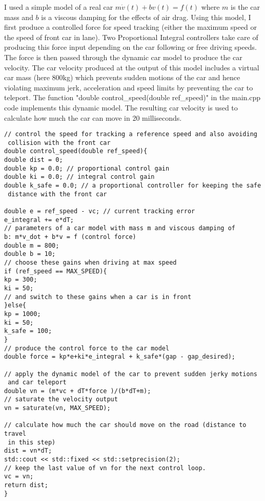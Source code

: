 \documentclass[12pt]{article}
\begin{document}
I used a simple model of a real car $m \dot{v} (t)+ bv(t) = f(t)$ where $m$ is the car mass and $b$ is a viscous damping for the effects of air drag. Using this model, I first produce a controlled force for speed tracking (either the maximum speed or the speed of front car in lane). Two Proportional Integral controllers take care of producing this force input depending on the car following or free driving speeds. The force is then passed through the dynamic car model to produce the car velocity. The car velocity produced at the output of this model includes a virtual car mass (here 800kg) which prevents sudden motions of the car and hence violating maximum jerk, acceleration and speed limits by preventing the car to teleport. The function "double control\_speed(double ref\_speed)" in the main.cpp code implements this dynamic model. The resulting car velocity is used to calculate how much the car can move in 20 milliseconds. 
\begin{verbatim}
// control the speed for tracking a reference speed and also avoiding
 collision with the front car
double control_speed(double ref_speed){
double dist = 0;
double kp = 0.0; // proportional control gain
double ki = 0.0; // integral control gain
double k_safe = 0.0; // a proportional controller for keeping the safe
 distance with the front car

double e = ref_speed - vc; // current tracking error
e_integral += e*dT;
// parameters of a car model with mass m and viscous damping of 
b: m*v_dot + b*v = f (control force)
double m = 800;
double b = 10;
// choose these gains when driving at max speed
if (ref_speed == MAX_SPEED){
kp = 300;
ki = 50;
// and switch to these gains when a car is in front
}else{
kp = 1000;
ki = 50;
k_safe = 100;
}	
// produce the control force to the car model 
double force = kp*e+ki*e_integral + k_safe*(gap - gap_desired);

// apply the dynamic model of the car to prevent sudden jerky motions
 and car teleport
double vn = (m*vc + dT*force )/(b*dT+m);
// saturate the velocity output
vn = saturate(vn, MAX_SPEED);

// calculate how much the car should move on the road (distance to travel
 in this step)
dist = vn*dT;	
std::cout << std::fixed << std::setprecision(2);
// keep the last value of vn for the next control loop. 
vc = vn;
return dist;
}
\end{verbatim}
\end{document}

